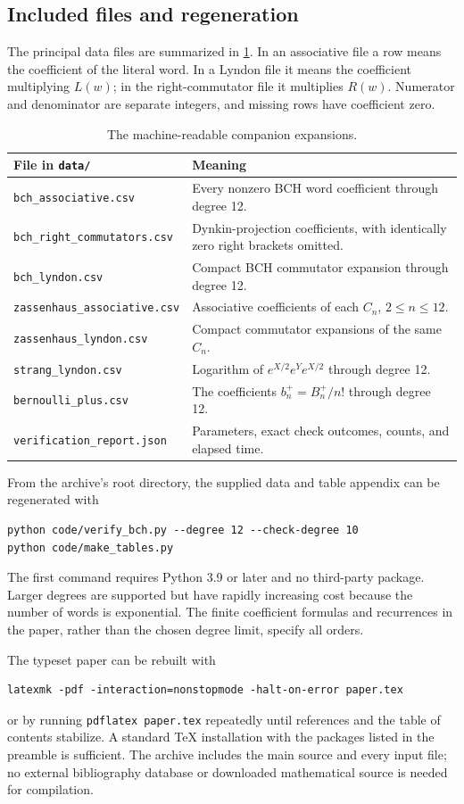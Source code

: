 \subsection{Included files and regeneration}
The principal data files are summarized in \cref{tab:data-files}. In an associative file a row means the coefficient of the literal word. In a Lyndon file it means the coefficient multiplying $L(w)$; in the right-commutator file it multiplies $R(w)$. Numerator and denominator are separate integers, and missing rows have coefficient zero.
\begin{table}[htbp]
\centering\small
\begin{tabular}{@{}p{}p{}@{}}
\toprule
File in \texttt{data/} & Meaning \\
\midrule
\texttt{bch\_associative.csv} & Every nonzero BCH word coefficient through degree 12.\\
\texttt{bch\_right\_commutators.csv} & Dynkin-projection coefficients, with identically zero right brackets omitted.\\
\texttt{bch\_lyndon.csv} & Compact BCH commutator expansion through degree 12.\\
\texttt{zassenhaus\_associative.csv} & Associative coefficients of each $C_n$, $2\leq n\leq12$.\\
\texttt{zassenhaus\_lyndon.csv} & Compact commutator expansions of the same $C_n$.\\
\texttt{strang\_lyndon.csv} & Logarithm of $e^{X/2}e^Ye^{X/2}$ through degree 12.\\
\texttt{bernoulli\_plus.csv} & The coefficients $b_n^+=B_n^+/n!$ through degree 12.\\
\texttt{verification\_report.json} & Parameters, exact check outcomes, counts, and elapsed time.\\
\bottomrule
\end{tabular}
\caption{The machine-readable companion expansions.}\label{tab:data-files}
\end{table}
From the archive's root directory, the supplied data and table appendix can be regenerated with
\begin{lstlisting}
python code/verify_bch.py --degree 12 --check-degree 10
python code/make_tables.py
\end{lstlisting}
The first command requires Python 3.9 or later and no third-party package. Larger degrees are supported but have rapidly increasing cost because the number of words is exponential. The finite coefficient formulas and recurrences in the paper, rather than the chosen degree limit, specify all orders.

The typeset paper can be rebuilt with
\begin{lstlisting}
latexmk -pdf -interaction=nonstopmode -halt-on-error paper.tex
\end{lstlisting}
or by running \texttt{pdflatex paper.tex} repeatedly until references and the table of contents stabilize. A standard TeX installation with the packages listed in the preamble is sufficient. The archive includes the main source and every input file; no external bibliography database or downloaded mathematical source is needed for compilation.

